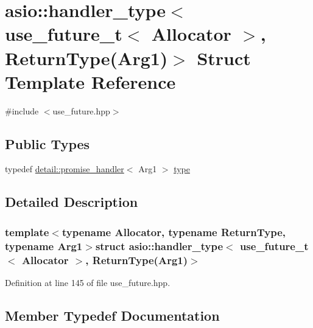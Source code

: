\hypertarget{structasio_1_1handler__type_3_01use__future__t_3_01_allocator_01_4_00_01_return_type_07_arg1_08_4}{}\section{asio\+:\+:handler\+\_\+type$<$ use\+\_\+future\+\_\+t$<$ Allocator $>$, Return\+Type(Arg1)$>$ Struct Template Reference}
\label{structasio_1_1handler__type_3_01use__future__t_3_01_allocator_01_4_00_01_return_type_07_arg1_08_4}


{\ttfamily \#include $<$use\+\_\+future.\+hpp$>$}

\subsection*{Public Types}
\begin{DoxyCompactItemize}
\item 
typedef \hyperlink{classasio_1_1detail_1_1promise__handler}{detail\+::promise\+\_\+handler}$<$ Arg1 $>$ \hyperlink{structasio_1_1handler__type_3_01use__future__t_3_01_allocator_01_4_00_01_return_type_07_arg1_08_4_aa4bca092e3f7ab436ab9a136bbae80f5}{type}
\end{DoxyCompactItemize}


\subsection{Detailed Description}
\subsubsection*{template$<$typename Allocator, typename Return\+Type, typename Arg1$>$struct asio\+::handler\+\_\+type$<$ use\+\_\+future\+\_\+t$<$ Allocator $>$, Return\+Type(\+Arg1)$>$}



Definition at line 145 of file use\+\_\+future.\+hpp.



\subsection{Member Typedef Documentation}
\hypertarget{structasio_1_1handler__type_3_01use__future__t_3_01_allocator_01_4_00_01_return_type_07_arg1_08_4_aa4bca092e3f7ab436ab9a136bbae80f5}{}
